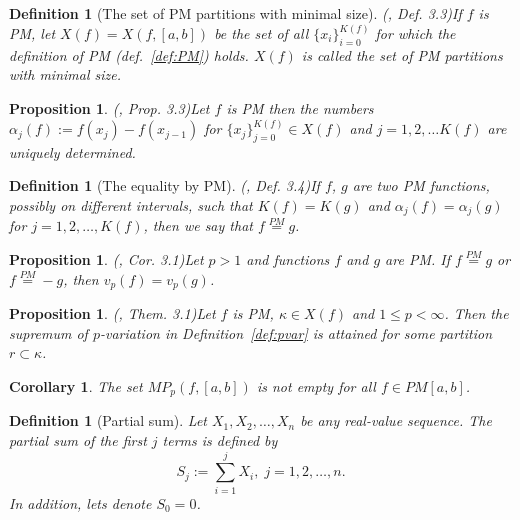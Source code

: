 \documentclass[12pt, a4paper]{article}
\newtheorem{proposition}[theorem]{Proposition}
\newtheorem{definition}[theorem]{Definition}
\newtheorem{corollary}[theorem]{Corollary}
\numberwithin{equation}{section}
\begin{document}
\begin{definition}[The set of PM partitions with minimal size](\cite{Qian}, Def. 3.3)\label{def:X_f}
  If $f$ is PM, let $X(f)=X(f,[a,b])$ be the set of all $\{x_{i}\}_{i=0}^{K(f)}$ for which the definition 
  of PM (def.~\ref{def:PM}) holds. $X(f)$ is called the \emph{set of PM partitions with minimal size}.
\end{definition}    
 
\begin{proposition}(\cite{Qian}, Prop. 3.3)\label{prop:PM_Unique}
  Let $f$ is PM then the numbers 
  $\alpha_j(f):=f(x_j) - f(x_{j-1})$ for
  $\{ x_j \}_{j=0}^{K(f)} \in X(f)$ and 
  $j=1,2,\dots K(f)$
  are uniquely determined.
\end{proposition}  
 
 
\begin{definition}[The equality by PM](\cite{Qian}, Def. 3.4)\label{def:EqPM}
  If $f$, $g$ are two PM functions, possibly on different intervals, such that 
  $K(f)=K(g)$ and $\alpha_j(f)=\alpha_j(g)$ for $j=1,2,\dots,K(f)$, then we say that
  $f \stackrel{PM}{=} g$.
\end{definition}    
  
\begin{proposition}(\cite{Qian}, Cor. 3.1)\label{prop:f_PM_g}
  Let $p>1$ and functions $f$ and $g$ are PM. 
  If $f \stackrel{PM}{=} g$ or $f \stackrel{PM}{=} -g$, then $v_p(f)=v_p(g)$.
\end{proposition} 

\begin{proposition}(\cite{Qian}, Them. 3.1)\label{prop:sup_in_PM}
  Let $f$ is PM, $\kappa \in X(f)$ and $1 \leq p < \infty$. 
  Then the supremum of $p$-variation in Definition~\ref{def:pvar}
  is attained for some partition $r \subset  \kappa$.
\end{proposition} 
\begin{corollary}
  The set $MP_{p}(f,[a,b])$ is not empty for all $f \in PM[a,b]$.  
\end{corollary}

\begin{definition}[Partial sum]
  Let $X_1, X_2,\dots,X_n$ be any real-value sequence. 
  The \emph{partial sum} of the first $j$ terms is defined by  
  \begin{equation}
    S_j:=\sum_{i=1}^j X_i, \; j=1,2,\dots,n.
  \end{equation}
  In addition, lets denote $S_0=0$.  
\end{definition}
\end{document}
